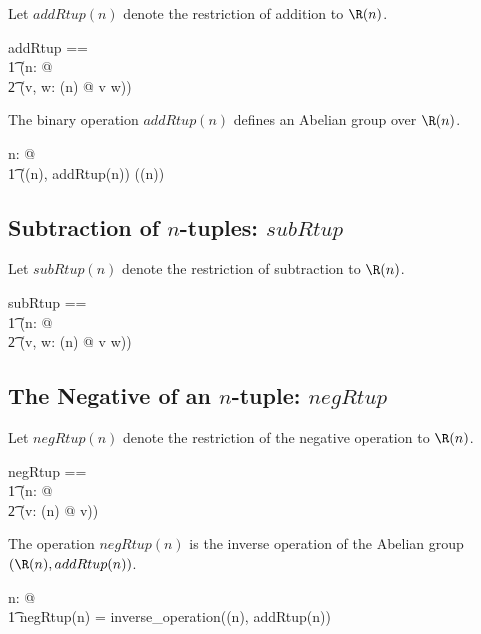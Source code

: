 \documentclass{amsart}
\begin{document}
Let $addRtup(n)$ denote the restriction of addition to $\Rtup(n)$.

\begin{zed}
addRtup == \\
\t1	(\lambda n: \nat @ \\
\t2		(\lambda v, w: \Rtup(n) @ v \addRinf w))
\end{zed}

\begin{example}
The binary operation $addRtup(n)$ defines an Abelian group over $\Rtup(n)$.

\begin{zed}
\forall n: \nat @ \\
\t1	(\Rtup(n), addRtup(n)) \in \abgroup(\Rtup(n))
\end{zed}

\end{example}

\subsection{Subtraction of $n$-tuples: $subRtup$}

Let $subRtup(n)$ denote the restriction of subtraction to $\Rtup(n)$.

\begin{zed}
subRtup == \\
\t1	(\lambda n: \nat @ \\
\t2		(\lambda v, w: \Rtup(n) @ v \subRinf w))
\end{zed}

\subsection{The Negative of an $n$-tuple: $negRtup$}

Let $negRtup(n)$ denote the restriction of the negative operation to $\Rtup(n)$.

\begin{zed}
negRtup == \\
\t1	(\lambda n: \nat @ \\
\t2		(\lambda v: \Rtup(n) @ \negRinf v))
\end{zed}

\begin{remark}
The operation $negRtup(n)$ is the inverse operation of the Abelian group $(\Rtup(n), addRtup(n))$.

\begin{zed}
\forall n: \nat @ \\
\t1	negRtup(n) = inverse\_operation(\Rtup(n), addRtup(n))
\end{zed}

\end{remark}
\end{document}
